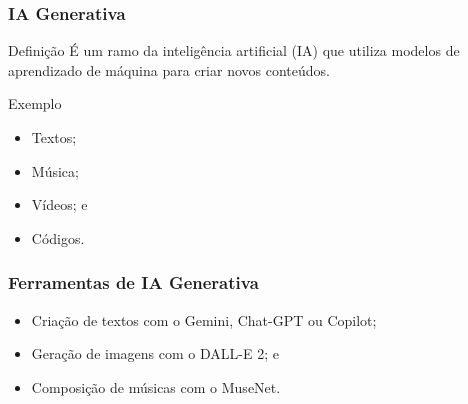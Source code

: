 \documentclass[aspectratio=169]{beamer} %
\begin{document}
\begin{frame}
	\frametitle{IA Generativa}
	
	\begin{block}{Definição}
		 É um ramo da inteligência artificial (IA) que utiliza modelos de aprendizado de máquina para criar novos conteúdos.
	\end{block}\vfill
	
	\begin{exampleblock}{Exemplo}
		\begin{itemize}
			\item Textos;
			\item Música;
			\item Vídeos; e
			\item Códigos.
		\end{itemize}
	\end{exampleblock}
\end{frame}

\begin{frame}
	\frametitle{Ferramentas de IA Generativa}
	
	\begin{itemize}
		\item Criação de textos com o Gemini, Chat-GPT ou Copilot;
		\item Geração de imagens com o DALL-E 2; e
		\item Composição de músicas com o MuseNet.
	\end{itemize}
\end{frame}
\end{document}
